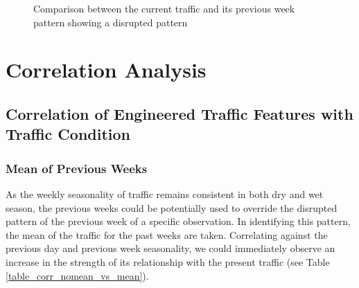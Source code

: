\begin{figure}[h] 
\centering
  \caption{Comparison between the current traffic and its previous week pattern showing a disrupted pattern}
  \label{figure_traffic_disrupted}
\end{figure}









\section{Correlation Analysis}
\subsection{Correlation of Engineered Traffic Features with Traffic Condition}

\subsubsection{Mean of Previous Weeks}
As the weekly seasonality of traffic remains consistent in both dry and wet season, the previous weeks could be potentially used to override the disrupted pattern of the previous week of a specific observation. In identifying this pattern, the mean of the traffic for the past weeks are taken. Correlating against the previous day and previous week seasonality, we could immediately observe an increase in the strength of its relationship with the present traffic (see Table \ref{table_corr_nomean_vs_mean}).


